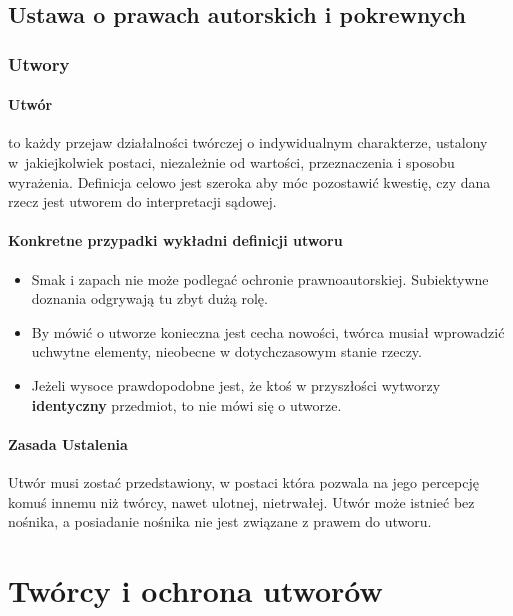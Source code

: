 \documentclass{article}
\begin{document}
\subsection{Ustawa o prawach autorskich i pokrewnych}

\subsubsection{Utwory}

\paragraph{Utwór}

to każdy przejaw działalności twórczej o indywidualnym charakterze, ustalony w~jakiejkolwiek postaci,
niezależnie od wartości, przeznaczenia i sposobu wyrażenia.
Definicja celowo jest szeroka aby móc pozostawić kwestię, czy dana rzecz jest utworem do interpretacji sądowej.

\paragraph{Konkretne przypadki wykładni definicji utworu}

\begin{itemize}
  \item Smak i zapach nie może podlegać ochronie prawnoautorskiej. Subiektywne doznania odgrywają tu zbyt dużą rolę.
  \item By mówić o utworze konieczna jest cecha nowości, twórca musiał wprowadzić uchwytne elementy, nieobecne w dotychczasowym stanie rzeczy.
  \item Jeżeli wysoce prawdopodobne jest, że ktoś w przyszłości wytworzy \textbf{identyczny} przedmiot, to nie mówi się o utworze.
\end{itemize}

\paragraph{Zasada Ustalenia}

Utwór musi zostać przedstawiony, w postaci która pozwala na jego percepcję komuś innemu niż twórcy, nawet ulotnej, nietrwałej.
Utwór może istnieć bez nośnika, a posiadanie nośnika nie jest związane z prawem do utworu.

\newpage

\section{Twórcy i ochrona utworów}
\end{document}
